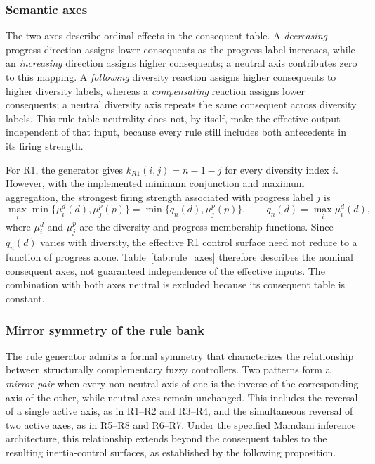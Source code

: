 \subsubsection{Semantic axes}

The two axes describe ordinal effects in the consequent table. A \emph{decreasing} progress direction assigns lower consequents as the progress label increases, while an \emph{increasing} direction assigns higher consequents; a neutral axis contributes zero to this mapping. A \emph{following} diversity reaction assigns higher consequents to higher diversity labels, whereas a \emph{compensating} reaction assigns lower consequents; a neutral diversity axis repeats the same consequent across diversity labels. This rule-table neutrality does not, by itself, make the effective output independent of that input, because every rule still includes both antecedents in its firing strength.

For R1, the generator gives $k_{R1}(i,j)=n-1-j$ for every diversity index $i$. However, with the implemented minimum conjunction and maximum aggregation, the strongest firing strength associated with progress label $j$ is
\begin{equation}
\max_i \min\{\mu_i^d(d),\mu_j^p(p)\}
=\min\{q_n(d),\mu_j^p(p)\},
\qquad q_n(d)=\max_i\mu_i^d(d),
\label{eq:r1_effective_firing}
\end{equation}
where $\mu_i^d$ and $\mu_j^p$ are the diversity and progress membership functions. Since $q_n(d)$ varies with diversity, the effective R1 control surface need not reduce to a function of progress alone. Table~\ref{tab:rule_axes} therefore describes the nominal consequent axes, not guaranteed independence of the effective inputs. The combination with both axes neutral is excluded because its consequent table is constant.



\subsubsection{Mirror symmetry of the rule bank}

The rule generator admits a formal symmetry that characterizes the relationship between structurally complementary fuzzy controllers. Two patterns form a \emph{mirror pair} when every non-neutral axis of one is the inverse of the corresponding axis of the other, while neutral axes remain unchanged. This includes the reversal of a single active axis, as in R1--R2 and R3--R4, and the simultaneous reversal of two active axes, as in R5--R8 and R6--R7. Under the specified Mamdani inference architecture, this relationship extends beyond the consequent tables to the resulting inertia-control surfaces, as established by the following proposition.


